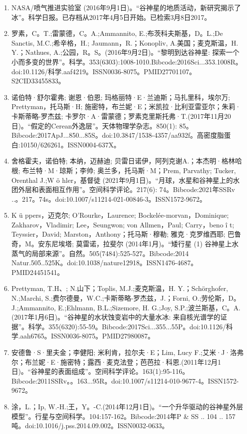 \begin{enumerate}
\item NASA/喷气推进实验室 (2016年9月1日)。“谷神星的地质活动，新研究揭示了冰”。科学日报。已存档从2017年4月5日开始。已检索3月8日2017。
\item 罗素，C。T.;雷蒙德，C。A.;Ammannito, E.;布茨科夫斯基，D。L.;De Sanctis, M.C.;希辛格，H.; Jaumann，R.；Konopliv, A.美国；麦克斯温，H. Y.；Nathues, A.;公园，R。S。(2016年9月2日)。“黎明到达谷神星: 探索一个小而多变的世界”。科学。353(6303):1008-1010.Bibcode:2016Sci...353.1008R。doi:10.1126/科学.aaf4219。ISSN0036-8075。PMID27701107。S2CID33455833。   
\item 诺伯特·舒尔霍弗; 谢恩·伯恩; 玛格丽特·E·兰迪斯；马扎里科，埃尔万; Prettyman，托马斯·H; 施密特，布兰妮·E；米凯拉·比利亚雷亚尔；朱莉·卡斯蒂略-罗杰兹; 卡罗尔·A·雷蒙德；罗素克里斯托弗·T.(2017年11月20日)。“假定的Cerean外逸层”。天体物理学杂志。850(1): 85。Bibcode:2017ApJ...850...85S。doi:10.3847/1538-4357/aa932f。高密度脂蛋白:10150/626261。ISSN0004-637X。 
\item 舍格霍夫，诺伯特; 本纳，迈赫迪; 贝雷日诺伊，阿列克谢A.；本杰明·格林哈根; 布兰特·M·琼斯；李帅; 奥兰多，托马斯·M；Prem, Parvathy; Tucker, Orenthal J.;W ö hler，基督徒 (2021年9月1日)。“月球，水星和谷神星上的水团外层和表面相互作用”。空间科学评论。217(6): 74。Bibcode:2021年SSRv ..。217。74s。doi:10.1007/s11214-021-00846-3。ISSN1572-9672。 
\item K ü ppers，迈克尔; O'Rourke，Laurence; Bockelée-morvan，Dominique; Zakharov，Vladimir; Lee，Seungwon; von Allmen，Paul; Carry，beno î t; Teyssier，David; Marston，Anthony；托马斯·穆勒; 雅克·克罗维西耶; 巴鲁奇，M。安东尼埃塔; 莫雷诺，拉斐尔 (2014年1月)。“矮行星 (1) 谷神星上水蒸气的局部来源”。自然。505(7484):525-527。Bibcode:2014 Natur.505..525K。doi:10.1038/nature12918。ISSN1476-4687。PMID24451541。  
\item Prettyman, T.H、; N.山下；Toplis, M.J.;麦克斯温，H. Y.；Schörghofer, N.;Marchi, S.;费尔德曼，W.C.;卡斯蒂略-罗杰兹，J.；Forni, O.;劳伦斯，D。J.;Ammannito, E.;Ehlmann, B.L.;Sizemore, H. G.;Joy, S.P.;波兰斯基，C。A.(2017年1月6日)。“谷神星的水状蚀变岩中的大量水冰: 来自核光谱学的证据”。科学。355(6320):55-59。Bibcode:2017Sci...355...55P。doi:10.1126/科学.aah6765。ISSN0036-8075。PMID27980087。  
\item 安德鲁·S·里夫金；李健阳; 米利肯，拉尔夫·E；Lim, Lucy F.;艾米·J·洛弗尔；布兰妮·E·施密特；露西·麦克法登；芭芭拉·科恩.(2011年12月1日)。“谷神星的表面组成”。空间科学评论。163(1):95-116。Bibcode:2011SSRv。。163...95R。doi:10.1007/s11214-010-9677-4。ISSN1572-9672。 
\item 涂，L.；Ip, W.-H.;王，Y。-C.(2014年12月1日)。“一个升华驱动的谷神星外层模型”。行星与空间科学。104:157-162。Bibcode:2014年P & SS .. 104 .. 157吨。doi:10.1016/j.pss.2014.09.002。ISSN0032-0633。 

\end{enumerate}
